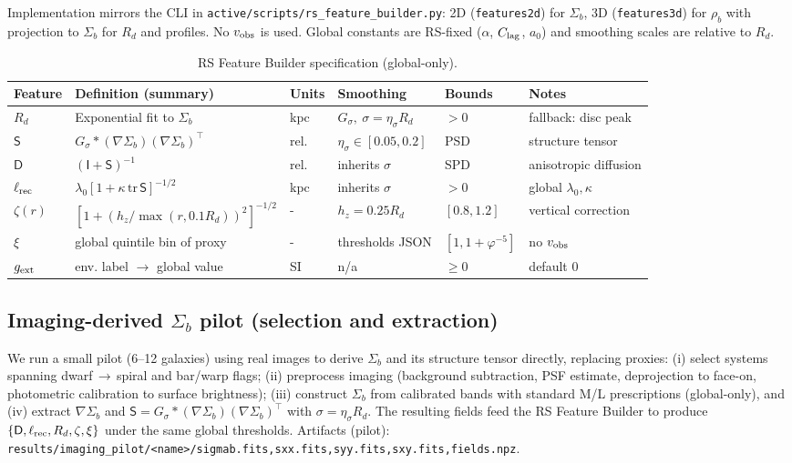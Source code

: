 \documentclass[fleqn,usenatbib]{mnras}
\begin{document}
\noindent Implementation mirrors the CLI in \texttt{active/scripts/rs\_feature\_builder.py}: 2D (\texttt{features2d}) for $\Sigma_b$, 3D (\texttt{features3d}) for $\rho_b$ with projection to $\Sigma_b$ for $R_d$ and profiles. No $v_{\rm obs}$ is used. Global constants are RS-fixed ($\alpha$, $C_{\rm lag}$, $a_0$) and smoothing scales are relative to $R_d$.

\begin{table}[h]
\centering
\caption{RS Feature Builder specification (global-only).}
\label{tab:rs_spec}
\begin{tabular}{l l l l l l}
\toprule
Feature & Definition (summary) & Units & Smoothing & Bounds & Notes \\
\midrule
$R_d$ & Exponential fit to $\Sigma_b$ & kpc & $G_{\sigma},\ \sigma=\eta_\sigma R_d$ & $>0$ & fallback: disc peak \\
$\mathsf S$ & $G_{\sigma}\!\ast (\nabla \Sigma_b)(\nabla \Sigma_b)^{\!\top}$ & rel. & $\eta_\sigma\in[0.05,0.2]$ & PSD & structure tensor \\
$\mathsf D$ & $(\mathsf I+\mathsf S)^{-1}$ & rel. & inherits $\sigma$ & SPD & anisotropic diffusion \\
$\ell_{\rm rec}$ & $\lambda_0[1+\kappa\,\mathrm{tr}\,\mathsf S]^{-1/2}$ & kpc & inherits $\sigma$ & $>0$ & global $\lambda_0,\kappa$ \\
$\zeta(r)$ & $[1+(h_z/\max(r,0.1R_d))^2]^{-1/2}$ & - & $h_z=0.25R_d$ & $[0.8,1.2]$ & vertical correction \\
$\xi$ & global quintile bin of proxy & - & thresholds JSON & $[1,1+\varphi^{-5}]$ & no $v_{\rm obs}$ \\
$g_{\rm ext}$ & env. label $\to$ global value & SI & n/a & $\ge 0$ & default $0$ \\
\bottomrule
\end{tabular}
\end{table}

\subsection{Imaging-derived $\Sigma_b$ pilot (selection and extraction)}
\noindent We run a small pilot (6--12 galaxies) using real images to derive $\Sigma_b$ and its structure tensor directly, replacing proxies: (i) select systems spanning dwarf\,$\to$\,spiral and bar/warp flags; (ii) preprocess imaging (background subtraction, PSF estimate, deprojection to face-on, photometric calibration to surface brightness); (iii) construct $\Sigma_b$ from calibrated bands with standard M/L prescriptions (global-only), and (iv) extract $\nabla\Sigma_b$ and $\mathsf S=G_{\sigma}\!\ast(\nabla\Sigma_b)(\nabla\Sigma_b)^{\!\top}$ with $\sigma=\eta_\sigma R_d$. The resulting fields feed the RS Feature Builder to produce $\{\mathsf D,\ell_{\rm rec},R_d,\zeta,\xi\}$ under the same global thresholds. Artifacts (pilot): \texttt{results/imaging\_pilot/<name>/{sigmab.fits,sxx.fits,syy.fits,sxy.fits,fields.npz}}.
\end{document}
